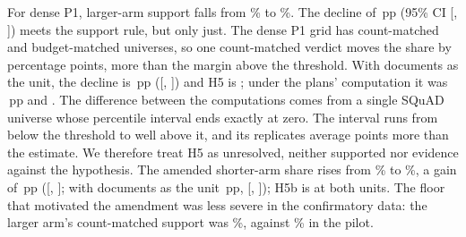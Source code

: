 \documentclass[11pt]{article}
\newcommand{\pp}{\ensuremath{\,\mathrm{pp}}}
\begin{document}
For dense P1, larger-arm support falls from \HFiveCountFiveTwelve\% to \HFiveBudgetFiveTwelve\%. The decline of \HFiveEst\pp{} (95\% CI [\HFiveLo, \HFiveHi]) meets the support rule, but only just. The dense P1 grid has \PoneDenseUniversesCount{} count-matched and \PoneDenseUniversesBudget{} budget-matched universes, so one count-matched verdict moves the share by \PoneDenseOneUniverse{} percentage points, more than the margin above the threshold. With documents as the unit, the decline is \HFiveDocEst\pp{} ([\HFiveDocLo, \HFiveDocHi]) and H5 is \HFiveDocVerdict; under the plans' computation it was \HFivePlannedEst\pp{} and \HFivePlannedVerdict. The difference between the computations comes from a single SQuAD universe whose percentile interval ends exactly at zero. The interval runs from below the threshold to well above it, and its replicates average \HFiveReplicateOffset{} points more than the estimate. We therefore treat H5 as unresolved, neither supported nor evidence against the hypothesis. The amended shorter-arm share rises from \HFiveBCount\% to \HFiveBBudget\%, a gain of \HFiveBEst\pp{} ([\HFiveBLo, \HFiveBHi]; with documents as the unit \HFiveBDocEst\pp, [\HFiveBDocLo, \HFiveBDocHi]); H5b is \HFiveBVerdict{} at both units. The floor that motivated the amendment was less severe in the confirmatory data: the larger arm's count-matched support was \HFiveCountFiveTwelve\%, against \HFivePilotCountFiveTwelve\% in the pilot.
\end{document}

